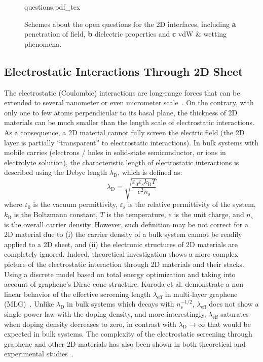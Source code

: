 \begin{figure}[h]
  \centering
  {questions.pdf_tex}
  \caption{\label{fig:intro-questions}%
    Schemes about the open questions for the 2D interfaces, including
    \textbf{a} penetration of field, \textbf{b} dielectric properties
    and \textbf{c} vdW \& wetting phenomena. }
\end{figure}


\subsection{Electrostatic Interactions Through 2D Sheet}
\label{sec:electr-inter-thro}

The electrostatic (Coulombic) interactions are long-range forces that
can be extended to several nano\-meter or even micro\-meter scale~\cite{Lacava_2016-electrodyn}.
%
On the contrary, with only one to few atoms perpendicular to its basal
plane, the thickness of 2D materials can be much smaller than the
length scale of electrostatic interactions.
%
As a consequence, a 2D material cannot fully screen the electric field
(\ie the 2D layer is partially ``transparent'' to electrostatic
interactions).
%
In bulk systems with mobile carries (electrons / holes in solid-state
semiconductor, or ions in electrolyte solution), the characteristic
length of electrostatic interactions is described using the Debye
length $\lambda_{\mathrm{D}}$, which is defined as:
\begin{equation}
  \label{eq:intro-debye}
  \lambda_{\mathrm{D}} = {\displaystyle \sqrt{
      \frac{\varepsilon_{0} \varepsilon_{\mathrm{s}} k_{\mathrm{B}} T}
      {e^{2} n_{\mathrm{s}}}
    }}
\end{equation}
where $\varepsilon_{0}$ is the vacuum permittivity,
$\varepsilon_{\mathrm{s}}$ is the relative permittivity of the system,
$k_{\mathrm{B}}$ is the Boltzmann constant, $T$ is the temperature,
$e$ is the unit charge, and $n_{\mathrm{s}}$ is the overall carrier
density.
%
However, such definition may be not correct for a 2D material due to
(i) the carrier density of a bulk system cannot be readily applied to
a 2D sheet, and (ii) the electronic structures of 2D materials are
completely ignored.
%
Indeed, theoretical investigation shows a more complex picture of the
electrostatic interaction through 2D materials and their stacks.
%
Using a discrete model based on total energy optimization and taking
into account of graphene's Dirac cone structure, Kuroda et
al. demonstrate a non-linear behavior of the effective screening
length $\lambda_{\mathrm{eff}}$ in multi-layer graphene
(MLG)~\cite{Kuroda_2011_PRL_ML,Kuroda_2011_ML_gr,Rokni_2017_charge_ML_Gr}.
%
Unlike $\lambda_{\mathrm{D}}$ in bulk systems which decays with
$n_{\mathrm{s}}^{-1/2}$, $\lambda_{\mathrm{eff}}$ does not show a
single power law with the doping density, and more interestingly,
$\lambda_{\mathrm{eff}}$ saturates when doping density decreases to
zero, in contrast with $\lambda_{\mathrm{D}} \to \infty$ that would be
expected in bulk systems.
%
The complexity of the electrostatic screening through graphene and
other 2D materials has also been shown in both theoretical and
experimental
studies~\cite{Datta_2009_ML_Screening,Uesugi_2013_EDL_ML,Goto_2013_ML_Gr,Liluhua_2014_hbn}.
%

